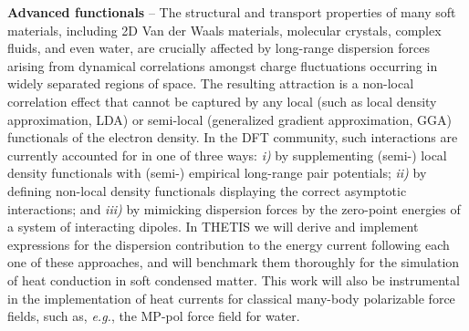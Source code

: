 \smallskip\noindent\textbf{Advanced functionals} -- The structural and transport properties of many soft materials, including 2D Van der Waals materials, molecular crystals, complex fluids, and even water, are crucially affected by long-range dispersion forces arising from dynamical correlations amongst charge fluctuations occurring in widely separated regions of space. The resulting attraction is a non-local correlation effect that cannot be captured by any local (such as local density approximation, LDA) or semi-local (generalized gradient approximation, GGA) functionals of the electron density.\cite{French_2010:long_range,Berland2015} In the DFT community, such interactions are currently accounted for in one of three ways: \emph{i)} by supplementing (semi-) local density functionals with (semi-) empirical long-range pair potentials;\cite{Grimme2007,Tkatchenko2009} \emph{ii)} by defining non-local density functionals displaying the correct asymptotic interactions;\cite{Dion2004} and \emph{iii)} by mimicking dispersion forces by the zero-point energies of a system of interacting dipoles.\cite{Tkatchenko2012} In THETIS we will derive and implement expressions for the dispersion contribution to the energy current following each one of these approaches, and will benchmark them thoroughly for the simulation of heat conduction in soft condensed matter. This work will also be instrumental in the implementation of heat currents for classical many-body polarizable force fields, such as, \emph{e.g.}, the MP-pol force field for water.\cite{Cisneros2016}

